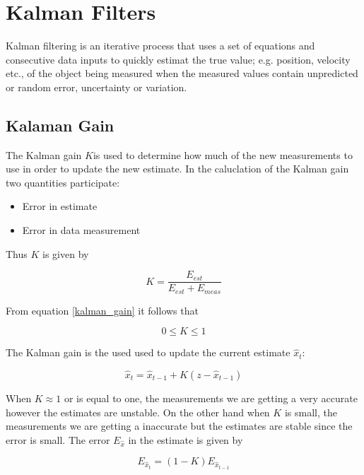 \section{Kalman Filters}
\label{kalman_filters}

Kalman filtering is an iterative process that uses a set of equations and consecutive data inputs to quickly estimat the 
true value; e.g. position, velocity etc., of the object being measured when the measured values contain unpredicted or 
random error, uncertainty or variation.



\subsection{Kalaman Gain}
The Kalman gain $K$is used to determine how much of the new measurements to use in order to update the new estimate.
In the caluclation of the Kalman gain two quantities participate:

\begin{itemize}
\item Error in estimate
\item Error in data measurement
\end{itemize}

Thus $K$ is given by

\begin{equation}
K = \frac{E_{est}}{E_{est} + E_{meas}}
\label{kalman_gain}
\end{equation} 

From equation \ref{kalman_gain} it follows that

\begin{equation}
0 \leq K \leq 1
\label{kalman_gain_condition}
\end{equation} 

The Kalman gain is the used used to update the current estimate $\hat{x}_t$:

\begin{equation}
\hat{x}_t = \hat{x}_{t-1} + K (z - \hat{x}_{t-1})
\label{new_estimate}
\end{equation} 


When $K \approx 1$ or is equal to one, the measurements we are getting a very accurate however the estimates are unstable. On the other hand when $K$ is small, 
the measurements we are getting a inaccurate but the estimates are stable since the error is small.
The error $E_{\hat{x}}$ in the estimate is given by 

\begin{equation}
E_{\hat{x}_t} = (1-K)E_{\hat{x}_{t-1}}
\label{estimate_error}
\end{equation}

